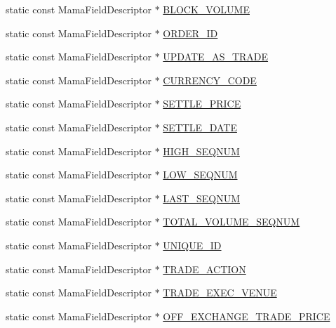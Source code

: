 \begin{CompactItemize}
\item 
static const Mama\-Field\-Descriptor $\ast$ \hyperlink{classWombat_1_1MamdaTradeFields_00edc0c65af9c0330be597700be1a5df}{BLOCK\_\-VOLUME}
\item 
static const Mama\-Field\-Descriptor $\ast$ \hyperlink{classWombat_1_1MamdaTradeFields_c127f75db6e5e1474193e6f48cc1691a}{ORDER\_\-ID}
\item 
static const Mama\-Field\-Descriptor $\ast$ \hyperlink{classWombat_1_1MamdaTradeFields_4627d2f5a7b8c6f0039937746e43d70c}{UPDATE\_\-AS\_\-TRADE}
\item 
static const Mama\-Field\-Descriptor $\ast$ \hyperlink{classWombat_1_1MamdaTradeFields_fe5bc671e92982a0470777c8fdf212fd}{CURRENCY\_\-CODE}
\item 
static const Mama\-Field\-Descriptor $\ast$ \hyperlink{classWombat_1_1MamdaTradeFields_7ffcf2b7f73dbdc4e3be0125ef72d200}{SETTLE\_\-PRICE}
\item 
static const Mama\-Field\-Descriptor $\ast$ \hyperlink{classWombat_1_1MamdaTradeFields_53c3e7a05c0f4f51bff06dfa6e92c97f}{SETTLE\_\-DATE}
\item 
static const Mama\-Field\-Descriptor $\ast$ \hyperlink{classWombat_1_1MamdaTradeFields_e670e24c98f50bca23665d0a6eb0b635}{HIGH\_\-SEQNUM}
\item 
static const Mama\-Field\-Descriptor $\ast$ \hyperlink{classWombat_1_1MamdaTradeFields_4bbf31d42c6c1cdbfa45e9f9a0f7d361}{LOW\_\-SEQNUM}
\item 
static const Mama\-Field\-Descriptor $\ast$ \hyperlink{classWombat_1_1MamdaTradeFields_6fa17497b82b094359150d95ca11dc09}{LAST\_\-SEQNUM}
\item 
static const Mama\-Field\-Descriptor $\ast$ \hyperlink{classWombat_1_1MamdaTradeFields_7c482bbc03ef706f02812fd8d4583ca5}{TOTAL\_\-VOLUME\_\-SEQNUM}
\item 
static const Mama\-Field\-Descriptor $\ast$ \hyperlink{classWombat_1_1MamdaTradeFields_af2ad21c98357d5e12577fdcd1dc40d9}{UNIQUE\_\-ID}
\item 
static const Mama\-Field\-Descriptor $\ast$ \hyperlink{classWombat_1_1MamdaTradeFields_0bd4ba9dd7d22062dd526c9ab719c3fb}{TRADE\_\-ACTION}
\item 
static const Mama\-Field\-Descriptor $\ast$ \hyperlink{classWombat_1_1MamdaTradeFields_60b345020cc6a16272a283590829ccfe}{TRADE\_\-EXEC\_\-VENUE}
\item 
static const Mama\-Field\-Descriptor $\ast$ \hyperlink{classWombat_1_1MamdaTradeFields_31fcff0fd8d226d47c80b375871d0855}{OFF\_\-EXCHANGE\_\-TRADE\_\-PRICE}

\end{CompactItemize}
